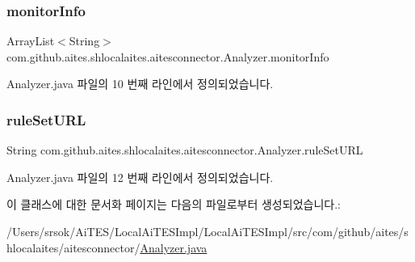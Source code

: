 \subsubsection{\texorpdfstring{monitor\+Info}{monitorInfo}}
{\footnotesize\ttfamily Array\+List$<$String$>$ com.\+github.\+aites.\+shlocalaites.\+aitesconnector.\+Analyzer.\+monitor\+Info\hspace{0.3cm}{\ttfamily [private]}}



Analyzer.\+java 파일의 10 번째 라인에서 정의되었습니다.

\mbox{\label{classcom_1_1github_1_1aites_1_1shlocalaites_1_1aitesconnector_1_1_analyzer_a4d70ca14c3921f457dbd46c8d1818f36}} 
\subsubsection{\texorpdfstring{rule\+Set\+U\+RL}{ruleSetURL}}
{\footnotesize\ttfamily String com.\+github.\+aites.\+shlocalaites.\+aitesconnector.\+Analyzer.\+rule\+Set\+U\+RL\hspace{0.3cm}{\ttfamily [private]}}



Analyzer.\+java 파일의 12 번째 라인에서 정의되었습니다.



이 클래스에 대한 문서화 페이지는 다음의 파일로부터 생성되었습니다.\+:\begin{DoxyCompactItemize}
\item 
/\+Users/srsok/\+Ai\+T\+E\+S/\+Local\+Ai\+T\+E\+S\+Impl/\+Local\+Ai\+T\+E\+S\+Impl/src/com/github/aites/shlocalaites/aitesconnector/\mbox{\hyperlink{_analyzer_8java}{Analyzer.\+java}}\end{DoxyCompactItemize}

